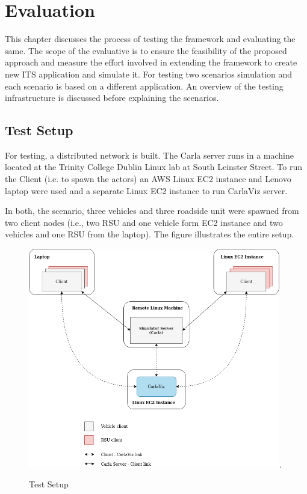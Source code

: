 \chapter{Evaluation}
This chapter discusses the process of testing the framework and evaluating the same.  The scope of the evaluative is to ensure the feasibility of the proposed approach and measure the effort involved in extending the framework to create new ITS application and simulate it.  For testing two scenarios simulation and each scenario is based on a different application.  An overview of the testing infrastructure is discussed before explaining the scenarios.
\section {Test Setup}
For testing, a distributed network is built. The  Carla server runs in a machine located at the Trinity College Dublin Linux lab at South Leinster Street. To run the Client (i.e. to spawn the actors) an AWS Linux EC2 instance and Lenovo laptop were used and a separate Linux EC2 instance to run CarlaViz server. 

In both, the scenario, three vehicles and three roadside unit were spawned from two client nodes (i.e., two RSU and one vehicle form EC2 instance and two vehicles and one RSU from the laptop). The figure illustrates the entire setup. 

 \begin{figure}[h!]
    \centering
    \includegraphics[width=11cm]{Framework/Images/testSetup.png}.
    \caption{Test Setup}
    \label{sequence}
\end{figure}

